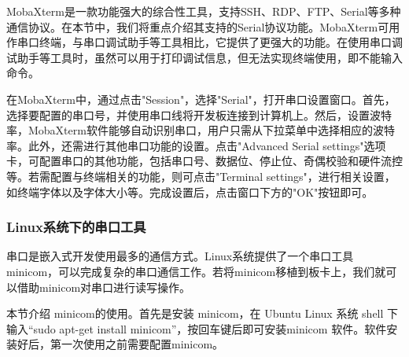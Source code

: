 MobaXterm是一款功能强大的综合性工具，支持SSH、RDP、FTP、Serial等多种通信协议。在本节中，我们将重点介绍其支持的Serial协议功能。MobaXterm可用作串口终端，与串口调试助手等工具相比，它提供了更强大的功能。在使用串口调试助手等工具时，虽然可以用于打印调试信息，但无法实现终端使用，即不能输入命令。


在MobaXterm中，通过点击"Session"，选择"Serial"，打开串口设置窗口。首先，选择要配置的串口号，并使用串口线将开发板连接到计算机上。然后，设置波特率，MobaXterm软件能够自动识别串口，用户只需从下拉菜单中选择相应的波特率。此外，还需进行其他串口功能的设置。点击"Advanced Serial settings"选项卡，可配置串口的其他功能，包括串口号、数据位、停止位、奇偶校验和硬件流控等。若需配置与终端相关的功能，则可点击"Terminal settings"，进行相关设置，如终端字体以及字体大小等。完成设置后，点击窗口下方的"OK"按钮即可。

\subsubsection{Linux系统下的串口工具}

串口是嵌入式开发使用最多的通信方式。Linux系统提供了一个串口工具minicom，可以完成复杂的串口通信工作。若将minicom移植到板卡上，我们就可以借助minicom对串口进行读写操作。


本节介绍 minicom的使用。首先是安装 minicom，在 Ubuntu Linux 系统 shell 下输入“sudo apt-get install minicom”，按回车键后即可安装minicom 软件。软件安装好后，第一次使用之前需要配置minicom。

